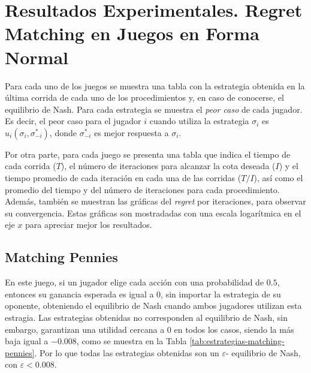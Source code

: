 \chapter{Resultados Experimentales. Regret Matching en Juegos en Forma Normal}

Para cada uno de los juegos se muestra una tabla con la estrategia obtenida en la última corrida de cada uno de los procedimientos y, en caso de conocerse, el equilibrio de Nash. Para cada estrategia se muestra el \textit{peor caso} de cada jugador. Es decir, el peor caso para el jugador $i$ cuando utiliza la estrategia $\sigma_{i}$ es $u_i(\sigma_i, \sigma^*_{-i})$, donde $\sigma^*_{-i}$ es mejor respuesta a $\sigma_i$.

Por otra parte, para cada juego se presenta una tabla que indica el tiempo de cada corrida ($T$), el número de iteraciones para alcanzar la cota deseada ($I$) y el tiempo promedio de cada iteración en cada una de las corridas ($T/I$), así como el promedio del tiempo y del número de iteraciones para cada procedimiento. Además, también se muestran las gráficas del \textit{regret} por iteraciones, para observar su convergencia. Estas gráficas son mostradadas con una escala logarítmica en el eje $x$ para apreciar mejor los resultados.

\newcommand{\graphicsRM}[2]{
\begin{figure}[htpb!]
    \caption{Gráficas del regret con respecto al número de iteraciones del juego #1}
    \label{fig:regret-#2}
    \centering
    \texttt{[image: graficas/\#2/procedimiento-A.png]}
    \texttt{[image: graficas/\#2/procedimiento-B.png]}
    \texttt{[image: graficas/\#2/procedimiento-C.png]}
\end{figure}
}

\section{Matching Pennies}

En este juego, si un jugador elige cada acción con una probabilidad de $0.5$, entonces su ganancia esperada es igual a $0$, sin importar la estrategia de su oponente, obteniendo el equilibrio de Nash cuando ambos jugadores utilizan esta estragia. Las estrategias obtenidas no corresponden al equilibrio de Nash, sin embargo, garantizan una utilidad cercana a $0$ en todos los casos, siendo la más baja igual a $-0.008$, como se muestra en la Tabla \ref{tab:estrategias-matching-pennies}. Por lo que todas las estrategias obtenidas son un $\varepsilon$- equilibrio de Nash, con $\varepsilon < 0.008$.

